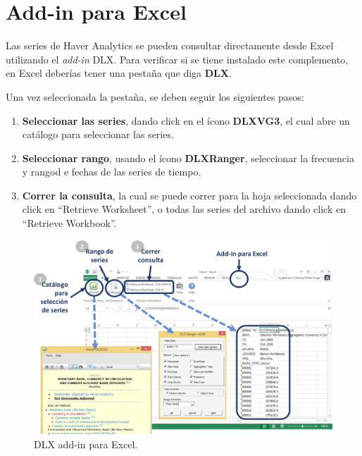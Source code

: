 \documentclass[
]{book}
\begin{document}
\hypertarget{add-in-para-excel}{%
\section{Add-in para Excel}\label{add-in-para-excel}}

Las series de Haver Analytics se pueden consultar directamente desde Excel utilizando el \emph{add-in} DLX. Para verificar si se tiene instalado este complemento, en Excel deberías tener una pestaña que diga \textbf{DLX}.

Una vez seleccionada la pestaña, se deben seguir los siguientes pasos:

\begin{enumerate}
\def\labelenumi{\arabic{enumi}.}
\item
  \textbf{Seleccionar las series}, dando click en el ícono \textbf{DLXVG3}, el cual abre un catálogo para seleccionar las series.
\item
  \textbf{Seleccionar rango}, usando el ícono \textbf{DLXRanger}, seleccionar la frecuencia y rangod e fechas de las series de tiempo.
\item
  \textbf{Correr la consulta}, la cual se puede correr para la hoja seleccionada dando click en ``Retrieve Worksheet'', o todas las series del archivo dando click en ``Retrieve Workbook''.
\end{enumerate}

\begin{figure}

{\centering \includegraphics[width=1\linewidth]{_img/dlx_add_in} 

}

\caption{DLX add-in para Excel.}\label{fig:addin}
\end{figure}
\end{document}
